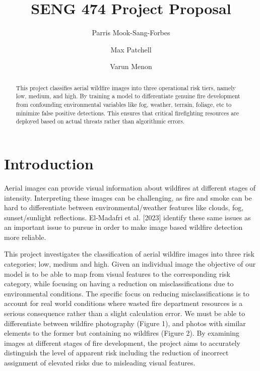 \documentclass[sigconf]{acmart}
\begin{document}
\title{SENG 474 Project Proposal}
\author{Parris Mook-Sang-Forbes}
\author{Max Patchell}
\author{Varun Menon}

\begin{abstract}
This project classifies aerial wildfire images into three operational risk tiers, namely low, medium, and high. By training a model to differentiate genuine fire development from confounding environmental variables like fog, weather, terrain, foliage, etc to minimize false positive detections. This ensures that critical firefighting resources are deployed based on actual threats rather than algorithmic errors.
\end{abstract}

\maketitle

\section{Introduction}
Aerial images can provide visual information about wildfires at different stages of intensity. Interpreting these images can be challenging, as fire and smoke can be hard to differentiate between environmental/weather features like clouds, fog, sunset/sunlight reflections. El-Madafri et al. [2023] identify these same issues as an important issue to pursue in order to make image based wildfire detection more reliable. 

This project investigates the classification of aerial wildfire images into three risk categories; low, medium and high. Given an individual image the objective of our model is to be able to map from visual features to the corresponding risk category, while focusing on having a reduction on misclassifications due to environmental conditions. The specific focus on reducing misclassifications is to account for real world conditions where wasted fire department resources is a serious consequence rather than a slight calculation error. We must be able to differentiate between wildfire photography (Figure 1), and photos with similar elements to the former but containing no wildfires (Figure 2). By examining images at different stages of fire development, the project aims to accurately distinguish the level of apparent risk including the reduction of incorrect assignment of elevated risks due to misleading visual features. 
\end{document}
